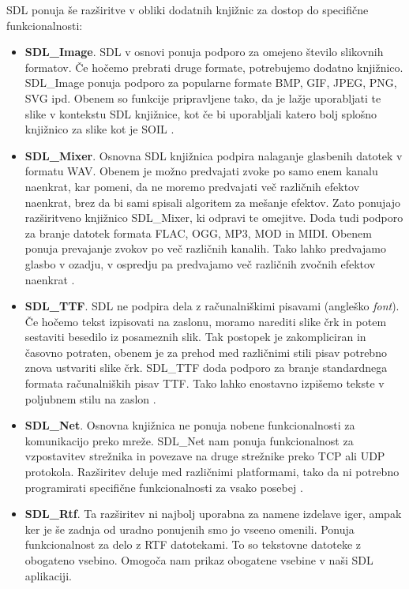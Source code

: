\documentclass[12pt,a4paper,twoside]{book}
\begin{document}
SDL ponuja še razširitve v obliki dodatnih knjižnic za dostop do specifične funkcionalnosti:
\begin{itemize}
	\item \textbf{SDL\_Image}. SDL v osnovi ponuja podporo za omejeno število slikovnih formatov. Če hočemo prebrati druge formate, potrebujemo dodatno knjižnico. SDL\_Image ponuja podporo za popularne formate BMP, GIF, JPEG, PNG, SVG ipd. Obenem so funkcije pripravljene tako, da je lažje uporabljati te slike v kontekstu SDL knjižnice, kot če bi uporabljali katero bolj splošno knjižnico za slike kot je SOIL \cite{sdlimage}.
	\item \textbf{SDL\_Mixer}. Osnovna SDL knjižnica podpira nalaganje glasbenih datotek v formatu WAV. Obenem je možno predvajati zvoke po samo enem kanalu naenkrat, kar pomeni, da ne moremo predvajati več različnih efektov naenkrat, brez da bi sami spisali algoritem za mešanje efektov. Zato ponujajo razširitveno knjižnico SDL\_Mixer, ki odpravi te omejitve. Doda tudi podporo za branje datotek formata FLAC, OGG, MP3, MOD in MIDI. Obenem ponuja prevajanje zvokov po več različnih kanalih. Tako lahko predvajamo glasbo v ozadju, v ospredju pa predvajamo več različnih zvočnih efektov naenkrat \cite{sdlmixer}.
	\item \textbf{SDL\_TTF}. SDL ne podpira dela z računalniškimi pisavami (angleško \textit{font}). Če hočemo tekst izpisovati na zaslonu, moramo narediti slike črk in potem sestaviti besedilo iz posameznih slik. Tak postopek je zakompliciran in časovno potraten, obenem je za prehod med različnimi stili pisav potrebno znova ustvariti slike črk. SDL\_TTF doda podporo za branje standardnega formata računalniških pisav TTF. Tako lahko enostavno izpišemo tekste v poljubnem stilu na zaslon \cite{sdlttf}.
	\item \textbf{SDL\_Net}. Osnovna knjižnica ne ponuja nobene funkcionalnosti za komunikacijo preko mreže. SDL\_Net nam ponuja funkcionalnost za vzpostavitev strežnika in povezave na druge strežnike preko TCP ali UDP protokola. Razširitev deluje med različnimi platformami, tako da ni potrebno programirati specifične funkcionalnosti za vsako posebej \cite{sdlnet}.
	\item \textbf{SDL\_Rtf}. Ta razširitev ni najbolj uporabna za namene izdelave iger, ampak ker je še zadnja od uradno ponujenih smo jo vseeno omenili. Ponuja funkcionalnost za delo z RTF datotekami. To so tekstovne datoteke z obogateno vsebino. Omogoča nam prikaz obogatene vsebine v naši SDL aplikaciji.
\end{itemize}
\end{document}
